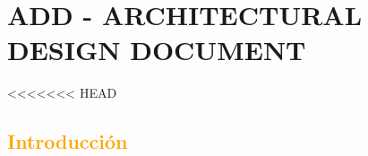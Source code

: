\chapter{\textcolor[gray]{.8}{ADD - ARCHITECTURAL DESIGN DOCUMENT}}
\newpage
<<<<<<< HEAD


\section{\textcolor{orange}{Introducción}}
